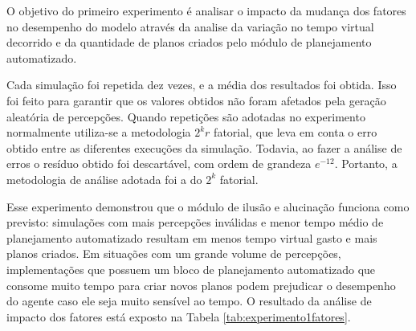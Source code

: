 O objetivo do primeiro experimento é analisar o impacto da mudança dos fatores no desempenho do modelo através da analise da variação no tempo virtual decorrido e da quantidade de planos criados pelo módulo de planejamento automatizado. 

Cada simulação foi repetida dez vezes, e a média dos resultados foi obtida. Isso foi feito para garantir que os valores obtidos não foram afetados pela geração aleatória de percepções. Quando repetições são adotadas no experimento normalmente utiliza-se a metodologia $2^k r$ fatorial, que leva em conta o erro obtido entre as diferentes execuções da simulação. Todavia, ao fazer a análise de erros o resíduo obtido foi descartável, com ordem de grandeza $e^{-12}$. Portanto, a metodologia de análise adotada foi a do  $2^k$ fatorial.

Esse experimento demonstrou que o módulo de ilusão e alucinação funciona como previsto: simulações com mais percepções inválidas e menor tempo médio de planejamento automatizado resultam em menos tempo virtual gasto e mais planos criados. Em situações com um grande volume de percepções, implementações que possuem um bloco de planejamento automatizado que consome muito tempo para criar novos planos podem prejudicar o desempenho do agente caso ele seja muito sensível ao tempo. O resultado da análise de impacto dos fatores está exposto na Tabela \ref{tab:experimento1fatores}.

